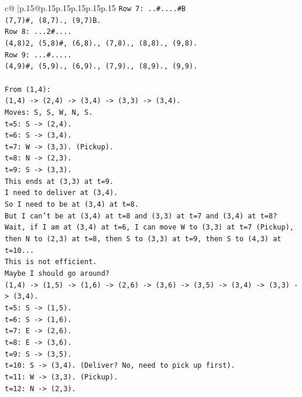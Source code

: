 \documentclass{article}
\begin{document}
{\begin{supertabular}{c@{$\;$}|p{.15\linewidth}@{}p{.15\linewidth}p{.15\linewidth}p{.15\linewidth}p{.15\linewidth}p{.15\linewidth}}
{{{\texttt{Row 7: ..\#....\#B} \\
\texttt{(7,7)\#, (8,7)., (9,7)B.} \\
\texttt{Row 8: ...2\#....} \\
\texttt{(4,8)2, (5,8)\#, (6,8)., (7,8)., (8,8)., (9,8).} \\
\texttt{Row 9: ...\#.....} \\
\texttt{(4,9)\#, (5,9)., (6,9)., (7,9)., (8,9)., (9,9).} \\
\\ 
\texttt{From (1,4):} \\
\texttt{(1,4) {-}> (2,4) {-}> (3,4) {-}> (3,3) {-}> (3,4).} \\
\texttt{Moves: S, S, W, N, S.} \\
\texttt{t=5: S {-}> (2,4).} \\
\texttt{t=6: S {-}> (3,4).} \\
\texttt{t=7: W {-}> (3,3). (Pickup).} \\
\texttt{t=8: N {-}> (2,3).} \\
\texttt{t=9: S {-}> (3,3).} \\
\texttt{This ends at (3,3) at t=9.} \\
\texttt{I need to deliver at (3,4).} \\
\texttt{So I need to be at (3,4) at t=8.} \\
\texttt{But I can't be at (3,4) at t=8 and (3,3) at t=7 and (3,4) at t=8?} \\
\texttt{Wait, if I am at (3,4) at t=6, I can move W to (3,3) at t=7 (Pickup), then N to (2,3) at t=8, then S to (3,3) at t=9, then S to (4,3) at t=10...} \\
\texttt{This is not efficient.} \\
\texttt{Maybe I should go around?} \\
\texttt{(1,4) {-}> (1,5) {-}> (1,6) {-}> (2,6) {-}> (3,6) {-}> (3,5) {-}> (3,4) {-}> (3,3) {-}> (3,4).} \\
\texttt{t=5: S {-}> (1,5).} \\
\texttt{t=6: S {-}> (1,6).} \\
\texttt{t=7: E {-}> (2,6).} \\
\texttt{t=8: E {-}> (3,6).} \\
\texttt{t=9: S {-}> (3,5).} \\
\texttt{t=10: S {-}> (3,4). (Deliver? No, need to pick up first).} \\
\texttt{t=11: W {-}> (3,3). (Pickup).} \\
\texttt{t=12: N {-}> (2,3).} \\
}}}
\end{supertabular}}
\end{document}
